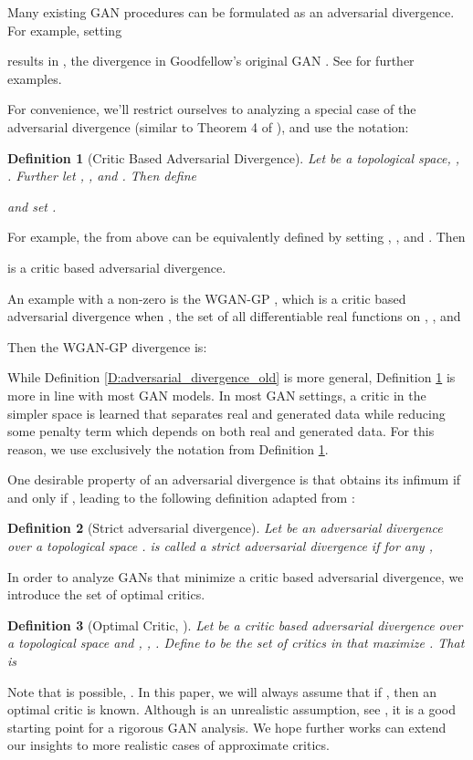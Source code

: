 \documentclass{article}
\newtheorem{definition}{Definition}
\begin{document}
Many existing GAN procedures can be formulated as an adversarial divergence. For example, setting
 
 
results in ,
the divergence in Goodfellow's original GAN \cite{goodfellow2014generative}.
See \cite{liu2017approximation} for further examples.

For convenience, we'll restrict ourselves to analyzing a special case of the adversarial divergence
(similar to Theorem 4 of \cite{liu2017approximation}), and use the notation:

\begin{definition}[Critic Based Adversarial Divergence]\label{D:adversarial_divergence}
 Let  be a topological space, , .
 Further let , ,  and .
 Then define
 
 and set .
\end{definition}

For example, the  from above can be equivalently defined by setting , ,  and . Then
 
is a critic based adversarial divergence.

An example with a non-zero  is the WGAN-GP \cite{gulrajani2017improved}, which is a critic based adversarial divergence when ,
the set of all differentiable real functions on ,
,  and

Then the WGAN-GP divergence  is:


While Definition \ref{D:adversarial_divergence_old} is more general, Definition \ref{D:adversarial_divergence} is more in line with most GAN models.
In most GAN settings, a critic in the simpler  space is learned that separates real and generated data
while reducing some penalty term  which depends on both real and generated data. For this reason, we use exclusively the notation from Definition \ref{D:adversarial_divergence}.

One desirable property of an adversarial divergence is that  obtains its infimum if and only if
, leading to the following definition adapted from \cite{liu2017approximation}:

\begin{definition}[Strict adversarial divergence]
 Let  be an adversarial divergence over a topological space .
  is called a strict adversarial divergence if for any ,
 
\end{definition}

In order to analyze GANs that minimize a critic based adversarial divergence, we introduce the set of optimal critics.
\begin{definition}[Optimal Critic,\; ]\label{D:opt_critic}
Let  be a critic based adversarial divergence over a topological space  and
, , .
 Define  to be the set of critics in  that maximize .
 That is

\end{definition}
Note that  is possible, \cite{arjovsky2017towards}. 
In this paper, we will always assume that if , 
then an optimal critic  is known. Although is an unrealistic assumption,
see \cite{binkowski2018demystifying}, it is a good starting point for a rigorous GAN analysis.
We hope further works can extend our insights to more realistic cases of approximate critics.
\end{document}
